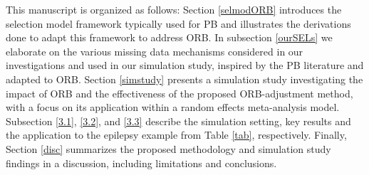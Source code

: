 \documentclass[twocolumn]{article}\usepackage[]{graphicx}\usepackage[]{xcolor}
\begin{document}
\begin{table}[!h]
\centering
\caption{Results for the outcomes "$50\%$ Seizure Reduction" and "Seizure Freedom" from 12 studies investigating the effect of Topiramate as an add-on treatment (T) vs. control (C) for drug-resistant focal epilepsy \citep{Copas2019, topiramate}.\\[0.5em]}
\label{tab}
\end{table}


\bigskip

This manuscript is organized as follows: Section \ref{selmodORB} introduces the selection model framework typically used for PB and illustrates the derivations done to adapt this framework to address ORB. In subsection \ref{ourSELs} we elaborate on the various missing data mechanisms considered in our investigations and used in our simulation study, inspired by the PB literature and adapted to ORB. Section \ref{simstudy} presents a simulation study investigating the impact of ORB and the effectiveness of the proposed ORB-adjustment method, with a focus on its application within a random effects meta-analysis model. Subsection \ref{3.1}, \ref{3.2}, and \ref{3.3} describe the simulation setting, key results and the application to the epilepsy example from Table \ref{tab}, respectively. Finally, Section \ref{disc} summarizes the proposed methodology and simulation study findings in a discussion, including limitations and conclusions.
\end{document}
